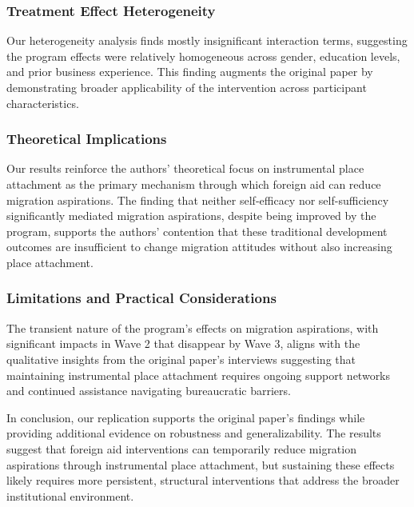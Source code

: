 \documentclass[
]{article}
\begin{document}
\subsubsection{Treatment Effect
Heterogeneity}\label{treatment-effect-heterogeneity}

Our heterogeneity analysis finds mostly insignificant interaction terms,
suggesting the program effects were relatively homogeneous across
gender, education levels, and prior business experience. This finding
augments the original paper by demonstrating broader applicability of
the intervention across participant characteristics.

\subsubsection{Theoretical Implications}\label{theoretical-implications}

Our results reinforce the authors' theoretical focus on instrumental
place attachment as the primary mechanism through which foreign aid can
reduce migration aspirations. The finding that neither self-efficacy nor
self-sufficiency significantly mediated migration aspirations, despite
being improved by the program, supports the authors' contention that
these traditional development outcomes are insufficient to change
migration attitudes without also increasing place attachment.

\subsubsection{Limitations and Practical
Considerations}\label{limitations-and-practical-considerations}

The transient nature of the program's effects on migration aspirations,
with significant impacts in Wave 2 that disappear by Wave 3, aligns with
the qualitative insights from the original paper's interviews suggesting
that maintaining instrumental place attachment requires ongoing support
networks and continued assistance navigating bureaucratic barriers.

In conclusion, our replication supports the original paper's findings
while providing additional evidence on robustness and generalizability.
The results suggest that foreign aid interventions can temporarily
reduce migration aspirations through instrumental place attachment, but
sustaining these effects likely requires more persistent, structural
interventions that address the broader institutional environment.
\end{document}
